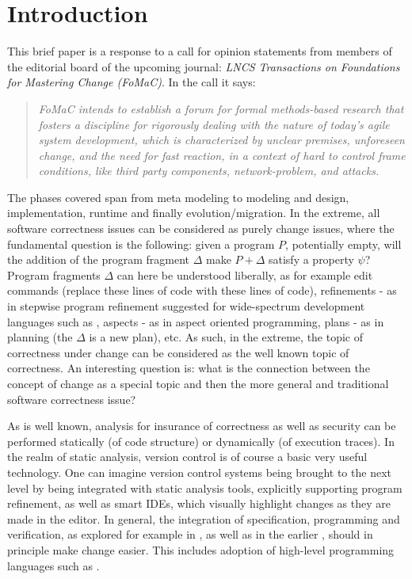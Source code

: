 
\section{Introduction}

This brief paper is a response to a call \cite{steffen-isola-2014} for opinion statements from 
members of the  editorial
board of the upcoming journal: {\em LNCS Transactions on Foundations for Mastering Change (FoMaC)}. In the call it says:


\begin{quote}
{\em FoMaC intends to establish a forum for formal methods-based research that fosters a discipline for rigorously dealing with the nature of today's agile system development, which is characterized by unclear premises, unforeseen change, and the need for fast reaction, in a context of hard to control frame conditions, like third party components, network-problem, and attacks.}
\end{quote}


The phases covered span from meta modeling to modeling and design, implementation, runtime and finally evolution/migration. 
%
In the extreme, all software correctness issues can be considered as purely change issues, where the fundamental question is the following: given a program $P$, potentially empty, will the addition of the  program fragment $\Delta$ make $P + \Delta$ satisfy a property $\psi$? Program fragments $\Delta$ can here be understood liberally, as for example edit commands (replace these lines of code with these lines of code), refinements - as in stepwise program refinement suggested for wide-spectrum development languages such as \vdm{} \cite{bjoerner-jones-82}, aspects - as in aspect oriented programming, plans - as in planning (the $\Delta$ is a new plan), etc. As such, in the extreme, the topic of correctness under change can  be considered as the well known topic of correctness. An interesting question is: what is the connection between the concept of change as
a special topic  and then the more general and traditional software correctness issue?

As is well known, analysis for insurance of correctness as well as security can be performed statically (of code structure) or dynamically (of execution traces). In the realm of static analysis, version control is
of course a basic very useful technology. One can imagine version control systems being brought to the next level by being integrated with static analysis tools, explicitly supporting program refinement, as well as smart IDEs, which visually highlight changes as they are made in the editor. In general, the integration of specification, programming and verification, as explored for example in \dafny{} \cite{DafnySite}, as well as in the earlier \vdm{} 
\cite{bjoerner-jones-82},  should in principle make change easier. This includes adoption of high-level programming languages such as \scala{} \cite{ScalaSite}. 

